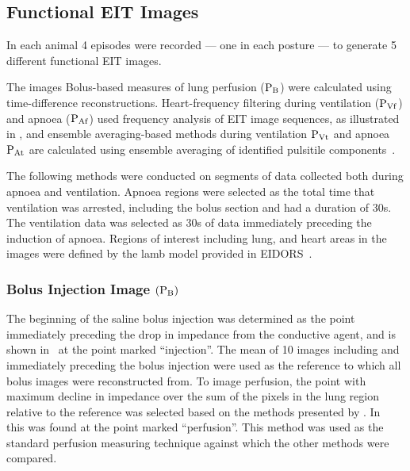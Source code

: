 \subsection{Functional EIT Images}

In each animal 4 episodes were recorded --- one in each posture --- to generate 5
different functional EIT images. 

The images
Bolus-based measures of lung perfusion (${\rm P_{B}}$) were
calculated using time-difference
reconstructions. Heart-frequency filtering during ventilation (${\rm P_{Vf}}$) and
apnoea (${\rm P_{Af}}$) used
frequency analysis of EIT image sequences, as 
illustrated in , and ensemble averaging-based methods during ventilation
${\rm P_{Vt}}$ and apnoea ${\rm P_{At}}$ are 
calculated using ensemble averaging of identified pulsitile components~.

The following methods were conducted on segments of data collected both during apnoea and ventilation. 
Apnoea regions were selected as the total time that ventilation was arrested, including the bolus section
and had a duration of 30s. The ventilation data was selected as 30s of data immediately preceding the 
induction of apnoea.
Regions of interest including lung, and heart areas in the images were defined by the lamb model
provided in EIDORS~\parencite{adler_eidors_2017}.

\subsubsection{Bolus Injection Image $({\rm P_{B}})$}

The beginning of the saline bolus injection was determined as the point
immediately preceding the drop in impedance from the conductive agent, and is
shown in~ at the point marked ``injection''.
The mean of 10 images including and immediately preceding the bolus injection were used 
as the reference to which all bolus images were reconstructed from. 
To image perfusion, the point with maximum decline in impedance over 
the sum of the pixels in the lung region relative to the reference was selected based on the methods 
presented by .
In~ this was found at the point marked ``perfusion''. 
This method was used as the standard perfusion 
measuring technique
against which the other methods were compared.

